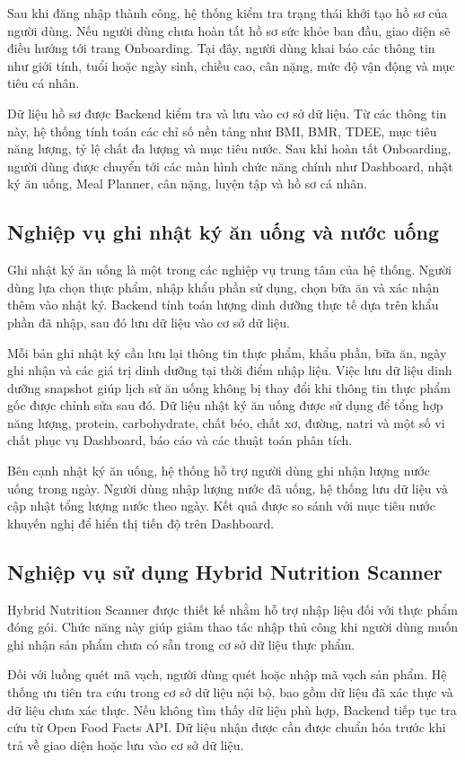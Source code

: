 \documentclass[12pt, a4paper]{report}
\begin{document}
Sau khi đăng nhập thành công, hệ thống kiểm tra trạng thái khởi tạo hồ sơ của người dùng. Nếu người dùng chưa hoàn tất hồ sơ sức khỏe ban đầu, giao diện sẽ điều hướng tới trang Onboarding. Tại đây, người dùng khai báo các thông tin như giới tính, tuổi hoặc ngày sinh, chiều cao, cân nặng, mức độ vận động và mục tiêu cá nhân.

Dữ liệu hồ sơ được Backend kiểm tra và lưu vào cơ sở dữ liệu. Từ các thông tin này, hệ thống tính toán các chỉ số nền tảng như BMI, BMR, TDEE, mục tiêu năng lượng, tỷ lệ chất đa lượng và mục tiêu nước. Sau khi hoàn tất Onboarding, người dùng được chuyển tới các màn hình chức năng chính như Dashboard, nhật ký ăn uống, Meal Planner, cân nặng, luyện tập và hồ sơ cá nhân.

\subsection{Nghiệp vụ ghi nhật ký ăn uống và nước uống}Ghi nhật ký ăn uống là một trong các nghiệp vụ trung tâm của hệ thống. Người dùng lựa chọn thực phẩm, nhập khẩu phần sử dụng, chọn bữa ăn và xác nhận thêm vào nhật ký. Backend tính toán lượng dinh dưỡng thực tế dựa trên khẩu phần đã nhập, sau đó lưu dữ liệu vào cơ sở dữ liệu.

Mỗi bản ghi nhật ký cần lưu lại thông tin thực phẩm, khẩu phần, bữa ăn, ngày ghi nhận và các giá trị dinh dưỡng tại thời điểm nhập liệu. Việc lưu dữ liệu dinh dưỡng snapshot giúp lịch sử ăn uống không bị thay đổi khi thông tin thực phẩm gốc được chỉnh sửa sau đó. Dữ liệu nhật ký ăn uống được sử dụng để tổng hợp năng lượng, protein, carbohydrate, chất béo, chất xơ, đường, natri và một số vi chất phục vụ Dashboard, báo cáo và các thuật toán phân tích.

Bên cạnh nhật ký ăn uống, hệ thống hỗ trợ người dùng ghi nhận lượng nước uống trong ngày. Người dùng nhập lượng nước đã uống, hệ thống lưu dữ liệu và cập nhật tổng lượng nước theo ngày. Kết quả được so sánh với mục tiêu nước khuyến nghị để hiển thị tiến độ trên Dashboard.

\subsection{Nghiệp vụ sử dụng Hybrid Nutrition Scanner}Hybrid Nutrition Scanner được thiết kế nhằm hỗ trợ nhập liệu đối với thực phẩm đóng gói. Chức năng này giúp giảm thao tác nhập thủ công khi người dùng muốn ghi nhận sản phẩm chưa có sẵn trong cơ sở dữ liệu thực phẩm.

Đối với luồng quét mã vạch, người dùng quét hoặc nhập mã vạch sản phẩm. Hệ thống ưu tiên tra cứu trong cơ sở dữ liệu nội bộ, bao gồm dữ liệu đã xác thực và dữ liệu chưa xác thực. Nếu không tìm thấy dữ liệu phù hợp, Backend tiếp tục tra cứu từ Open Food Facts API. Dữ liệu nhận được cần được chuẩn hóa trước khi trả về giao diện hoặc lưu vào cơ sở dữ liệu.
\end{document}

